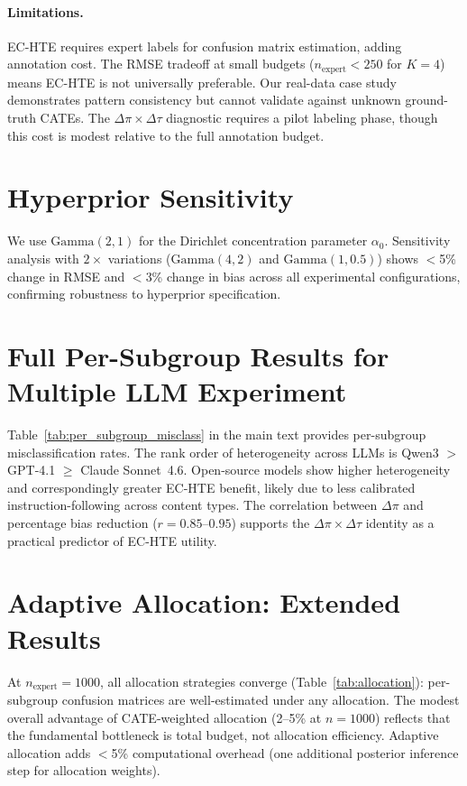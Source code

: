 \documentclass[11pt,a4paper]{article}
\begin{document}
\paragraph{Limitations.}
EC-HTE requires expert labels for confusion matrix estimation, adding annotation cost.
The RMSE tradeoff at small budgets ($n_{\text{expert}} < 250$ for $K=4$) means EC-HTE is not universally preferable.
Our real-data case study demonstrates pattern consistency but cannot validate against unknown ground-truth CATEs.
The $\Delta\pi \times \Delta\tau$ diagnostic requires a pilot labeling phase, though this cost is modest relative to the full annotation budget.




\appendix

\section{Hyperprior Sensitivity}\label{app:hyperprior}

We use $\text{Gamma}(2, 1)$ for the Dirichlet concentration parameter $\alpha_0$.
Sensitivity analysis with $2\times$ variations ($\text{Gamma}(4, 2)$ and $\text{Gamma}(1, 0.5)$) shows $<$5\% change in RMSE and $<$3\% change in bias across all experimental configurations, confirming robustness to hyperprior specification.

\section{Full Per-Subgroup Results for Multiple LLM Experiment}\label{app:llm_full}

Table~\ref{tab:per_subgroup_misclass} in the main text provides per-subgroup misclassification rates.
The rank order of heterogeneity across LLMs is Qwen3 $>$ GPT-4.1 $\geq$ Claude Sonnet~4.6.
Open-source models show higher heterogeneity and correspondingly greater EC-HTE benefit, likely due to less calibrated instruction-following across content types.
The correlation between $\Delta\pi$ and percentage bias reduction ($r = 0.85$--$0.95$) supports the $\Delta\pi \times \Delta\tau$ identity as a practical predictor of EC-HTE utility.

\section{Adaptive Allocation: Extended Results}\label{app:allocation}

At $n_{\text{expert}} = 1000$, all allocation strategies converge (Table~\ref{tab:allocation}): per-subgroup confusion matrices are well-estimated under any allocation.
The modest overall advantage of CATE-weighted allocation (2--5\% at $n=1000$) reflects that the fundamental bottleneck is total budget, not allocation efficiency.
Adaptive allocation adds $<$5\% computational overhead (one additional posterior inference step for allocation weights).
\end{document}
